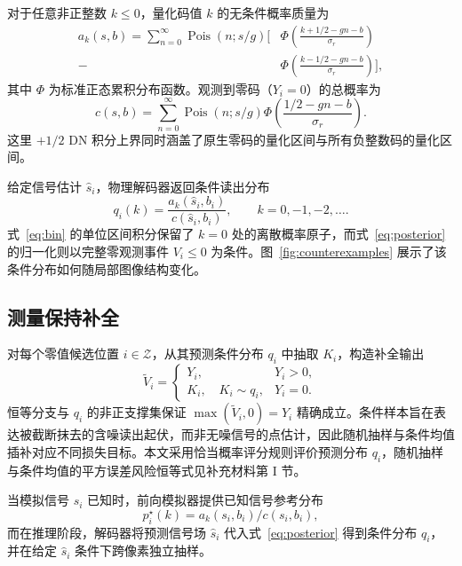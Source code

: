 \documentclass[10pt,twocolumn,journal]{IEEEtran}
\begin{document}
对于任意非正整数 $k\leq0$，量化码值 $k$ 的无条件概率质量为
\begin{align}
a_k(s,b)=\sum_{n=0}^{\infty}\operatorname{Pois}(n;s/g)
\bigg[&\Phi\!\left(\frac{k+1/2-gn-b}{\sigma_r}\right)\nonumber\\[-2pt]
-&\Phi\!\left(\frac{k-1/2-gn-b}{\sigma_r}\right)\bigg],\label{eq:bin}
\end{align}
其中 $\Phi$ 为标准正态累积分布函数。观测到零码（$Y_i=0$）的总概率为
\begin{equation}
c(s,b)=\sum_{n=0}^{\infty}\operatorname{Pois}(n;s/g)
\Phi\!\left(\frac{1/2-gn-b}{\sigma_r}\right).\label{eq:zeroevent}
\end{equation}
这里 $+1/2$ DN 积分上界同时涵盖了原生零码的量化区间与所有负整数码的量化区间。

给定信号估计 $\hat s_i$，物理解码器返回条件读出分布
\begin{equation}
q_i(k)=\frac{a_k(\hat s_i,b_i)}{c(\hat s_i,b_i)},\qquad k=0,-1,-2,\ldots.\label{eq:posterior}
\end{equation}
式~\eqref{eq:bin} 的单位区间积分保留了 $k=0$ 处的离散概率原子，而式~\eqref{eq:posterior} 的归一化则以完整零观测事件 $V_i\leq0$ 为条件。图~\ref{fig:counterexamples} 展示了该条件分布如何随局部图像结构变化。

\subsection{测量保持补全}
对每个零值候选位置 $i\in\mathcal Z$，从其预测条件分布 $q_i$ 中抽取 $K_i$，构造补全输出
\begin{equation}
\widetilde V_i=\begin{cases}
Y_i,&Y_i>0,\\
K_i,\quad K_i\sim q_i,&Y_i=0.
\end{cases}\label{eq:output}
\end{equation}
恒等分支与 $q_i$ 的非正支撑集保证 $\max(\widetilde V_i,0)=Y_i$ 精确成立。条件样本旨在表达被截断抹去的含噪读出起伏，而非无噪信号的点估计，因此随机抽样与条件均值插补对应不同损失目标。本文采用恰当概率评分规则评价预测分布 $q_i$，随机抽样与条件均值的平方误差风险恒等式见补充材料第 I 节。

当模拟信号 $s_i$ 已知时，前向模拟器提供已知信号参考分布
\begin{equation}
p^{\star}_i(k)=a_k(s_i,b_i)/c(s_i,b_i),\label{eq:oracle}
\end{equation}
而在推理阶段，解码器将预测信号场 $\hat s_i$ 代入式~\eqref{eq:posterior} 得到条件分布 $q_i$，并在给定 $\hat s_i$ 条件下跨像素独立抽样。
\end{document}
